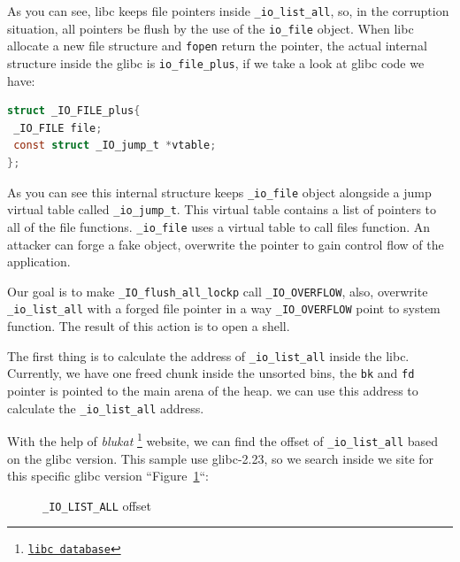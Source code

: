 \documentclass{masterthesis}
\newcommand*\libc{glibc}
\newcommand*\ub{unsorted bins}
\begin{document}
As you can see, libc keeps file pointers inside \lstinline{_io_list_all}, so, in the corruption situation, all pointers be flush by the use of the \lstinline{io_file} object. When libc allocate a new file structure and \lstinline{fopen} return the pointer, the actual internal structure inside the \libc{} is \lstinline{io_file_plus}, if we take a look at \libc{} code we have:

\begin{lstlisting}[language=c,frame=tlrb]
struct _IO_FILE_plus{
 _IO_FILE file;
 const struct _IO_jump_t *vtable;
};
\end{lstlisting}

As you can see this internal structure keeps \lstinline{_io_file} object alongside a jump virtual table called \lstinline{_io_jump_t}. This virtual table contains a list of pointers to all of the file functions. \lstinline{_io_file} uses a virtual table to call files function. An attacker can forge a fake object, overwrite the pointer to gain control flow of the application.

Our goal is to make \lstinline{_IO_flush_all_lockp} call \lstinline{_IO_OVERFLOW}, also, overwrite \lstinline{_io_list_all} with a forged file pointer in a way \lstinline{_IO_OVERFLOW} point to system function. The result of this action is to open a shell.

The first thing is to calculate the address of \lstinline{_io_list_all} inside the libc. Currently, we have one freed chunk inside the \ub{}, the \lstinline{bk} and \lstinline{fd} pointer is pointed to the main arena of the heap. we can use this address to calculate the \lstinline{_io_list_all} address.

With the help of \emph{blukat} \footnote{\href{https://libc.blukat.me}{\texttt{libc database}}} website, we can find the offset of \lstinline{_io_list_all} based on the \libc{} version. This sample use \libc{-2.23}, so we search inside we site for this specific \libc{} version ``Figure~\ref{fig:offset}``:

\begin{figure}[h!]
 \caption{\lstinline{_IO_LIST_ALL} offset}
 \label{fig:offset}
\end{figure}
\end{document}
